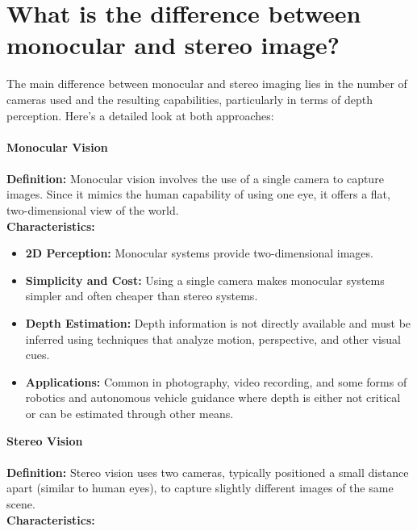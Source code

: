 \documentclass[22pt]{report}
\begin{document}
    \section{What is the difference between monocular and stereo image?}
        The main difference between monocular and stereo imaging lies in the number of cameras used and the resulting capabilities, particularly in terms of depth perception. Here's a detailed look at both approaches:\\\\
        \textbf{Monocular Vision}\\\\
        \textbf{Definition:} Monocular vision involves the use of a single camera to capture images. Since it mimics the human capability of using one eye, it offers a flat, two-dimensional view of the world.\\
        \textbf{Characteristics:}
        \begin{itemize}
            \item \textbf{2D Perception:} Monocular systems provide two-dimensional images.
            \item \textbf{Simplicity and Cost:} Using a single camera makes monocular systems simpler and often cheaper than stereo systems.
            \item \textbf{Depth Estimation:} Depth information is not directly available and must be inferred using techniques that analyze motion, perspective, and other visual cues.
            \item \textbf{Applications:} Common in photography, video recording, and some forms of robotics and autonomous vehicle guidance where depth is either not critical or can be estimated through other means.\\
        \end{itemize}
        \textbf{Stereo Vision}\\\\
        \textbf{Definition:}
        Stereo vision uses two cameras, typically positioned a small distance apart (similar to human eyes), to capture slightly different images of the same scene.\\
        \textbf{Characteristics:}
\end{document}
